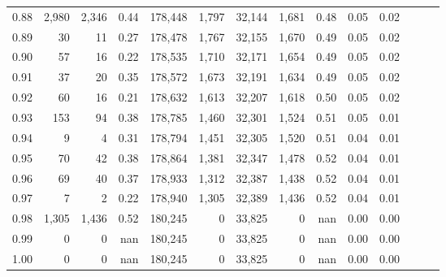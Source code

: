\begin{tabular}{rrrrrrrrrrrrrr}
0.88 &   2,980 &  2,346 &  0.44 &  178,448 &    1,797 &  32,144 &   1,681 &  0.48 &  0.05 &      0.02 \\
0.89 &      30 &     11 &  0.27 &  178,478 &    1,767 &  32,155 &   1,670 &  0.49 &  0.05 &      0.02 \\
0.90 &      57 &     16 &  0.22 &  178,535 &    1,710 &  32,171 &   1,654 &  0.49 &  0.05 &      0.02 \\
0.91 &      37 &     20 &  0.35 &  178,572 &    1,673 &  32,191 &   1,634 &  0.49 &  0.05 &      0.02 \\
0.92 &      60 &     16 &  0.21 &  178,632 &    1,613 &  32,207 &   1,618 &  0.50 &  0.05 &      0.02 \\
0.93 &     153 &     94 &  0.38 &  178,785 &    1,460 &  32,301 &   1,524 &  0.51 &  0.05 &      0.01 \\
0.94 &       9 &      4 &  0.31 &  178,794 &    1,451 &  32,305 &   1,520 &  0.51 &  0.04 &      0.01 \\
0.95 &      70 &     42 &  0.38 &  178,864 &    1,381 &  32,347 &   1,478 &  0.52 &  0.04 &      0.01 \\
0.96 &      69 &     40 &  0.37 &  178,933 &    1,312 &  32,387 &   1,438 &  0.52 &  0.04 &      0.01 \\
0.97 &       7 &      2 &  0.22 &  178,940 &    1,305 &  32,389 &   1,436 &  0.52 &  0.04 &      0.01 \\
0.98 &   1,305 &  1,436 &  0.52 &  180,245 &        0 &  33,825 &       0 &   nan &  0.00 &      0.00 \\
0.99 &       0 &      0 &   nan &  180,245 &        0 &  33,825 &       0 &   nan &  0.00 &      0.00 \\
1.00 &       0 &      0 &   nan &  180,245 &        0 &  33,825 &       0 &   nan &  0.00 &      0.00 \\
\bottomrule
\end{tabular}

